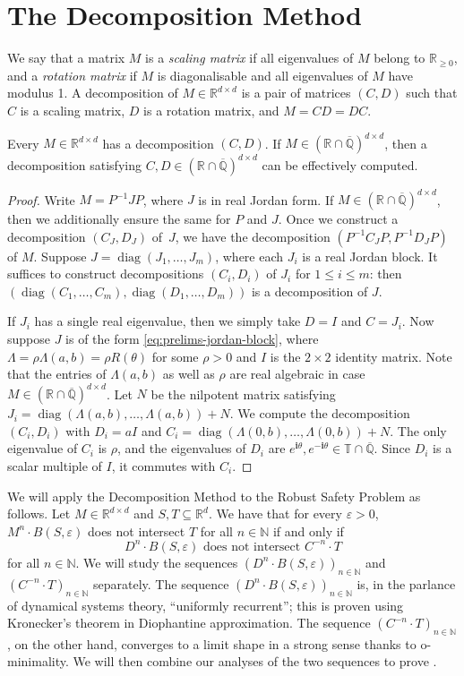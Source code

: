 \documentclass[a4paper,UKenglish,cleveref]{lipics-v2021}
\newcommand{\torus}{\mathbb{T}}
\newcommand{\nat}{\mathbb{N}}
\newcommand{\rel}{\mathbb{R}}
\newcommand{\rat}{\mathbb{Q}}
\newcommand{\alg}{\overline{\rat}}
\newcommand{\ralg}{\rel \cap \alg}
\newcommand{\diag}{\operatorname{diag}}
\newcommand{\im}{\bm{i}}
\begin{document}
\section{The Decomposition Method}

We say that a matrix $M$ is a \emph{scaling matrix} if all eigenvalues of $M$ belong to $\rel_{\ge 0}$, and a \emph{rotation matrix} if $M$ is diagonalisable and all eigenvalues of $M$ have modulus 1.
A decomposition of $M\in\rel^{d\times d}$ is a pair of matrices $(C,D)$ such that $C$ is a scaling matrix, $D$ is a rotation matrix, and $M = CD = DC$.

\begin{lemma}
	Every $M \in \rel^{d\times d}$ has a decomposition $(C,D)$.
	If $M \in (\ralg)^{d\times d}$, then a decomposition satisfying $C, D \in (\ralg)^{d\times d}$ can be effectively computed.
\end{lemma}
\begin{proof}
	Write $M = P^{-1}JP$, where $J$ is in real Jordan form.
	If $M \in (\ralg)^{d\times d}$, then we additionally ensure the same for $P$ and $J$.
	Once we construct a decomposition $(C_J, D_J)$ of~$J$, we have the decomposition $(P^{-1}C_JP, P^{-1}D_JP)$ of $M$.
	Suppose $J = \diag(J_1,\ldots,J_m)$, where each $J_i$ is a real Jordan block.
	It suffices to construct decompositions $(C_i,D_i)$ of $J_i$ for $1\le i \le m$: then $(\diag(C_1,\ldots,C_m), \diag(D_1,\ldots,D_m))$ is a decomposition of $J$.
	
	If $J_i$ has a single real eigenvalue, then we simply take $D = I$ and $C = J_i$.
	Now suppose $J$ is of the form \eqref{eq:prelims-jordan-block}, where $\Lambda = \rho \Lambda(a,b) = \rho R(\theta)$  for some $\rho> 0$ and $I$ is the $2\times 2$ identity matrix.
	Note that the entries of $\Lambda(a,b)$ as well as $\rho$ are real algebraic in case $M \in (\ralg)^{d\times d}$.
	Let $N$ be the nilpotent matrix satisfying $J_i = \diag(\Lambda(a,b),\ldots,\Lambda(a,b)) + N$.
	We compute the decomposition $(C_i, D_i)$ with $D_i = a I$ and $C_i = \diag(\Lambda(0,b),\ldots,\Lambda(0,b)) + N$.
	The only eigenvalue of $C_i$ is $\rho$, and the eigenvalues of $D_i$ are $e^{\im \theta}, e^{-\im\theta} \in \torus \cap \alg$.
	Since $D_i$ is a scalar multiple of $I$, it commutes with $C_i$.
\end{proof}

We will apply the Decomposition Method to the Robust Safety Problem as follows.
Let $M \in \rel^{d\times d}$ and $S, T \subseteq \rel^d$.
We have that for every $\varepsilon > 0$, $M^n \cdot B(S, \varepsilon)$ does not intersect $T$ for all $n \in\nat$ if and only if
\[
D^n \cdot B(S,\varepsilon) \textrm{ does not intersect } C^{-n} \cdot T
\]
for all $n \in \nat$.
We will study the sequences $(D^n \cdot B(S,\varepsilon))_{n\in\nat}$ and $(C^{-n}\cdot T)_{n\in\nat}$ separately.
The sequence $(D^n \cdot B(S,\varepsilon))_{n\in\nat}$ is, in the parlance of dynamical systems theory, ``uniformly recurrent''; this is proven using Kronecker's theorem in Diophantine approximation.
The sequence $(C^{-n}\cdot T)_{n\in\nat}$, on the other hand, converges to a limit shape in a strong sense thanks to o-minimality.
We will then combine our analyses of the two sequences to prove .
\end{document}
